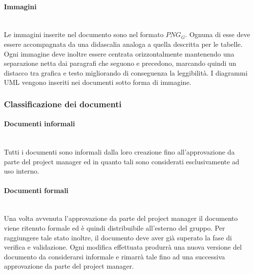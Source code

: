 		\paragraph{Immagini}\mbox{} \\
		Le immagini inserite nel documento sono nel formato $PNG_G$. Ognuna di esse deve essere accompagnata da una didascalia analoga a quella descritta per le tabelle. 
		Ogni immagine deve inoltre essere centrata orizzontalmente mantenendo una separazione netta dai paragrafi che seguono e precedono, marcando quindi un distacco tra grafica e testo migliorando di conseguenza la leggibilità. 
		I diagrammi UML vengono inseriti nei documenti sotto forma di immagine.
	\subsubsection{Classificazione dei documenti}
		\paragraph{Documenti informali}\mbox{} \\
		Tutti i documenti sono informali dalla loro creazione fino all'approvazione da parte del project manager ed in quanto tali sono considerati esclusivamente ad uso interno.
		\paragraph{Documenti formali}\mbox{} \\
		Una volta avvenuta l'approvazione da parte del project manager il documento viene ritenuto formale ed è quindi distribuibile all'esterno del gruppo.
		Per raggiungere tale stato inoltre, il documento deve aver già superato la fase di verifica e validazione. 
Ogni modifica effettuata produrrà una nuova versione del documento da considerarsi informale e rimarrà tale fino ad una successiva approvazione da parte del project manager.
